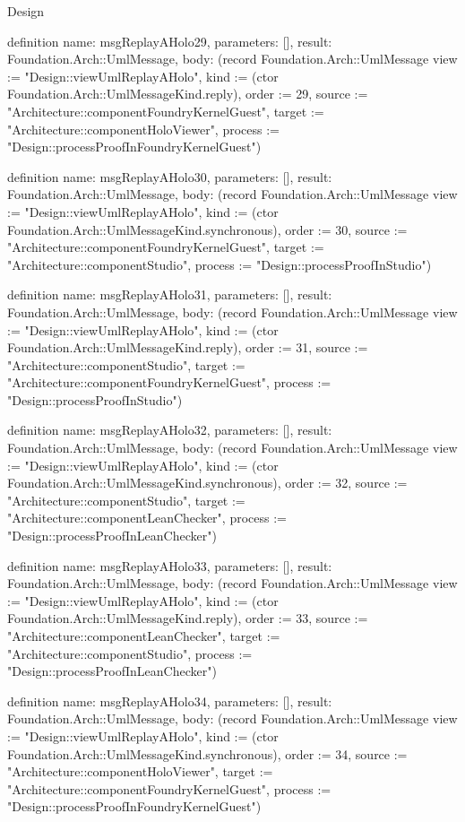 \begin{lexlean}{Design}
\begin{semanticmodule}
definition{
  name: msgReplayAHolo29,
  parameters: [],
  result: Foundation.Arch::UmlMessage,
  body: (record Foundation.Arch::UmlMessage {view := "Design::viewUmlReplayAHolo", kind := (ctor Foundation.Arch::UmlMessageKind.reply), order := 29, source := "Architecture::componentFoundryKernelGuest", target := "Architecture::componentHoloViewer", process := "Design::processProofInFoundryKernelGuest"})
}

definition{
  name: msgReplayAHolo30,
  parameters: [],
  result: Foundation.Arch::UmlMessage,
  body: (record Foundation.Arch::UmlMessage {view := "Design::viewUmlReplayAHolo", kind := (ctor Foundation.Arch::UmlMessageKind.synchronous), order := 30, source := "Architecture::componentFoundryKernelGuest", target := "Architecture::componentStudio", process := "Design::processProofInStudio"})
}

definition{
  name: msgReplayAHolo31,
  parameters: [],
  result: Foundation.Arch::UmlMessage,
  body: (record Foundation.Arch::UmlMessage {view := "Design::viewUmlReplayAHolo", kind := (ctor Foundation.Arch::UmlMessageKind.reply), order := 31, source := "Architecture::componentStudio", target := "Architecture::componentFoundryKernelGuest", process := "Design::processProofInStudio"})
}

definition{
  name: msgReplayAHolo32,
  parameters: [],
  result: Foundation.Arch::UmlMessage,
  body: (record Foundation.Arch::UmlMessage {view := "Design::viewUmlReplayAHolo", kind := (ctor Foundation.Arch::UmlMessageKind.synchronous), order := 32, source := "Architecture::componentStudio", target := "Architecture::componentLeanChecker", process := "Design::processProofInLeanChecker"})
}

definition{
  name: msgReplayAHolo33,
  parameters: [],
  result: Foundation.Arch::UmlMessage,
  body: (record Foundation.Arch::UmlMessage {view := "Design::viewUmlReplayAHolo", kind := (ctor Foundation.Arch::UmlMessageKind.reply), order := 33, source := "Architecture::componentLeanChecker", target := "Architecture::componentStudio", process := "Design::processProofInLeanChecker"})
}

definition{
  name: msgReplayAHolo34,
  parameters: [],
  result: Foundation.Arch::UmlMessage,
  body: (record Foundation.Arch::UmlMessage {view := "Design::viewUmlReplayAHolo", kind := (ctor Foundation.Arch::UmlMessageKind.synchronous), order := 34, source := "Architecture::componentHoloViewer", target := "Architecture::componentFoundryKernelGuest", process := "Design::processProofInFoundryKernelGuest"})
}


\end{semanticmodule}
\end{lexlean}
